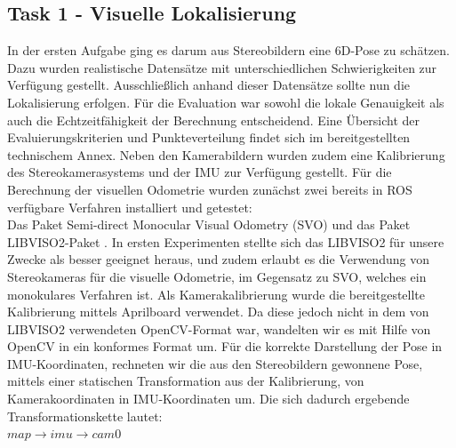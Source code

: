 \documentclass[12pt,titlepage, a4paper]{article}
\begin{document}
\subsection{Task 1 - Visuelle Lokalisierung}
In der ersten Aufgabe ging es darum aus Stereobildern eine 6D-Pose zu schätzen. Dazu wurden realistische Datensätze mit unterschiedlichen Schwierigkeiten zur Verfügung gestellt.
Ausschließlich anhand dieser Datensätze sollte nun die Lokalisierung erfolgen. Für die Evaluation war sowohl die lokale Genauigkeit als auch die Echtzeitfähigkeit der Berechnung entscheidend.
Eine Übersicht der Evaluierungskriterien und Punkteverteilung findet sich im bereitgestellten technischem Annex\cite{eurocannex}.
Neben den Kamerabildern wurden zudem eine Kalibrierung des Stereokamerasystems und der IMU zur Verfügung gestellt. 
Für die Berechnung der visuellen Odometrie wurden zunächst zwei bereits in ROS verfügbare Verfahren installiert und getestet:\\
Das Paket Semi-direct Monocular Visual Odometry (SVO)\cite{EPFL-CONF-199740} und das Paket \mbox{LIBVISO2}-Paket \cite{Geiger11}.
In ersten Experimenten stellte sich das \mbox{LIBVISO2} für unsere Zwecke als besser geeignet heraus, und zudem erlaubt es die Verwendung von Stereokameras für die visuelle Odometrie, 
im Gegensatz zu SVO, welches ein monokulares Verfahren ist.
Als Kamerakalibrierung wurde die bereitgestellte Kalibrierung mittels Aprilboard verwendet. Da diese jedoch nicht in dem von \mbox{LIBVISO2} verwendeten OpenCV-Format war, wandelten wir es mit Hilfe von OpenCV
in ein konformes Format um.
Für die korrekte Darstellung der Pose in IMU-Koordinaten, rechneten wir die aus den Stereobildern gewonnene Pose, mittels einer statischen Transformation aus der Kalibrierung, von Kamerakoordinaten 
in IMU-Koordinaten um.
Die sich dadurch ergebende Transformationskette lautet:\\

$  map \rightarrow imu \rightarrow cam0 $\\
\end{document}
